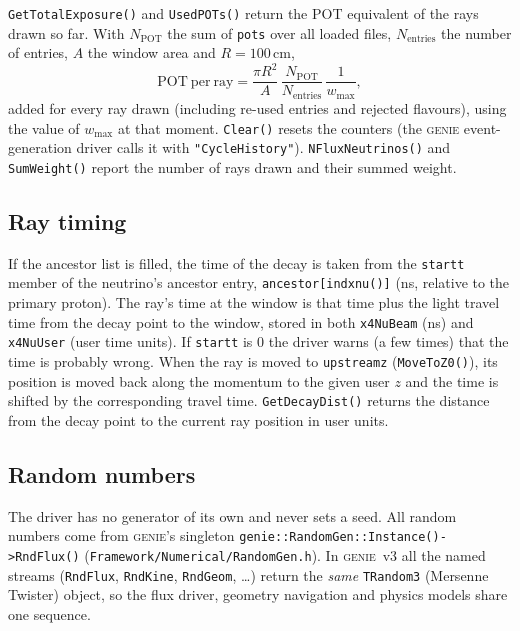 \documentclass[11pt]{article}
\newcommand{\code}[1]{\texttt{#1}}
\newcommand{\genie}{\textsc{genie}\xspace}
\begin{document}
\code{GetTotalExposure()} and \code{UsedPOTs()} return the POT equivalent
of the rays drawn so far.  With $N_\mathrm{POT}$ the sum of \code{pots}
over all loaded files, $N_\mathrm{entries}$ the number of entries, $A$
the window area and $R = 100$\,cm,
\begin{equation}
  \mathrm{POT\ per\ ray} = \frac{\pi R^2}{A}\,
     \frac{N_\mathrm{POT}}{N_\mathrm{entries}}\,\frac{1}{w_\mathrm{max}},
\end{equation}
added for every ray drawn (including re-used entries and rejected
flavours), using the value of $w_\mathrm{max}$ at that moment.
\code{Clear()} resets the counters (the \genie event-generation driver calls
it with \code{"CycleHistory"}).  \code{NFluxNeutrinos()} and
\code{SumWeight()} report the number of rays drawn and their summed weight.

\subsection{Ray timing}\label{sec:genie-time}

If the ancestor list is filled, the time of the decay is taken from the
\code{startt} member of the neutrino's ancestor entry,
\code{ancestor[indxnu()]} (ns, relative to the primary proton).  The ray's time at the window is that time plus the light travel
time from the decay point to the window, stored in both \code{x4NuBeam}
(ns) and \code{x4NuUser} (user time units).  If \code{startt} is 0 the
driver warns (a few times) that the time is probably wrong.  When the ray
is moved to \code{upstreamz} (\code{MoveToZ0()}), its position is moved
back along the momentum to the given user $z$ and the time is shifted by
the corresponding travel time.  \code{GetDecayDist()} returns the
distance from the decay point to the current ray position in user units.

\subsection{Random numbers}\label{sec:genie-random}

The driver has no generator of its own and never sets a seed.  All random
numbers come from \genie's singleton
\code{genie::RandomGen::Instance()->RndFlux()}
(\code{Framework/Numerical/RandomGen.h}).  In \genie~v3 all the named
streams (\code{RndFlux}, \code{RndKine}, \code{RndGeom}, \ldots) return the
\emph{same} \code{TRandom3} (Mersenne Twister) object, so the flux driver,
geometry navigation and physics models share one sequence.
\end{document}
